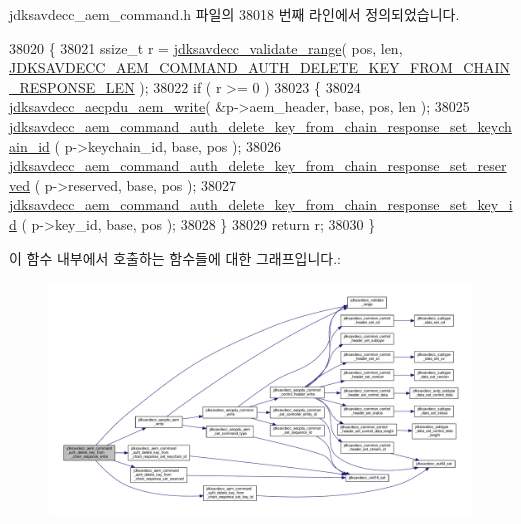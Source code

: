 jdksavdecc\+\_\+aem\+\_\+command.\+h 파일의 38018 번째 라인에서 정의되었습니다.


\begin{DoxyCode}
38020 \{
38021     ssize\_t r = \hyperlink{group__util_ga9c02bdfe76c69163647c3196db7a73a1}{jdksavdecc\_validate\_range}( pos, len, 
      \hyperlink{group__command__auth__delete__key__from__chain__response_ga318d8a52d9e3502557122ceced9277fd}{JDKSAVDECC\_AEM\_COMMAND\_AUTH\_DELETE\_KEY\_FROM\_CHAIN\_RESPONSE\_LEN}
       );
38022     \textcolor{keywordflow}{if} ( r >= 0 )
38023     \{
38024         \hyperlink{group__aecpdu__aem_gad658e55771cce77cecf7aae91e1dcbc5}{jdksavdecc\_aecpdu\_aem\_write}( &p->aem\_header, base, pos, len );
38025         
      \hyperlink{group__command__auth__delete__key__from__chain__response_gac1598617db3a583f1ba0e4e646fe3769}{jdksavdecc\_aem\_command\_auth\_delete\_key\_from\_chain\_response\_set\_keychain\_id}
      ( p->keychain\_id, base, pos );
38026         \hyperlink{group__command__auth__delete__key__from__chain__response_ga04d78f5c1e83b34088ca91f89185ad5e}{jdksavdecc\_aem\_command\_auth\_delete\_key\_from\_chain\_response\_set\_reserved}
      ( p->reserved, base, pos );
38027         \hyperlink{group__command__auth__delete__key__from__chain__response_gaa6705b0b19fcbcbf9b628b84f39fe5c8}{jdksavdecc\_aem\_command\_auth\_delete\_key\_from\_chain\_response\_set\_key\_id}
      ( p->key\_id, base, pos );
38028     \}
38029     \textcolor{keywordflow}{return} r;
38030 \}
\end{DoxyCode}


이 함수 내부에서 호출하는 함수들에 대한 그래프입니다.\+:
\nopagebreak
\begin{figure}[H]
\begin{center}
\leavevmode
\includegraphics[width=350pt]{group__command__auth__delete__key__from__chain__response_ga51a5b3ee4cd46ba10a72bddc0b48c26b_cgraph}
\end{center}
\end{figure}


